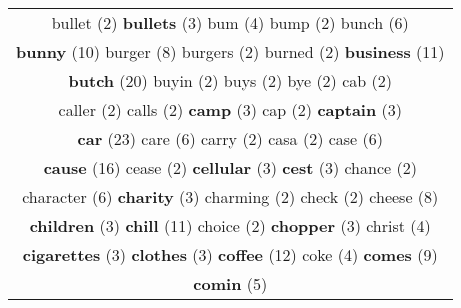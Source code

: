 \documentclass[12pt,a4paper]{article}
\begin{document}
\begin{center}
\begin{longtable}{|c|}
{\footnotesize \textcolor{Verde} {bullet}} \footnotesize{(2)} {\small \textcolor{Laranja} {\bf bullets}} \footnotesize{(3)} {\normalsize \textcolor{VerdeLocao} {bum}} \footnotesize{(4)} {\footnotesize \textcolor{Verde} {bump}} \footnotesize{(2)} {\Large \textcolor{VermEscuro} {bunch}} \footnotesize{(6)}  \\ {\Huge \textcolor{AzulEscuro} {\bf bunny}} \footnotesize{(10)} {\huge \textcolor{Amarelo} {burger}} \footnotesize{(8)} {\footnotesize \textcolor{Verde} {burgers}} \footnotesize{(2)} {\footnotesize \textcolor{Verde} {burned}} \footnotesize{(2)} {\Huge \textcolor{AzulEscuro} {\bf business}} \footnotesize{(11)}  \\ {\Huge \textcolor{AzulEscuro} {\bf butch}} \footnotesize{(20)} {\footnotesize \textcolor{Verde} {buyin}} \footnotesize{(2)} {\footnotesize \textcolor{Verde} {buys}} \footnotesize{(2)} {\footnotesize \textcolor{Verde} {bye}} \footnotesize{(2)} {\footnotesize \textcolor{Verde} {cab}} \footnotesize{(2)}  \\ {\footnotesize \textcolor{Verde} {caller}} \footnotesize{(2)} {\footnotesize \textcolor{Verde} {calls}} \footnotesize{(2)} {\small \textcolor{Laranja} {\bf camp}} \footnotesize{(3)} {\footnotesize \textcolor{Verde} {cap}} \footnotesize{(2)} {\small \textcolor{Laranja} {\bf captain}} \footnotesize{(3)}  \\ {\Huge \textcolor{AzulEscuro} {\bf car}} \footnotesize{(23)} {\Large \textcolor{VermEscuro} {care}} \footnotesize{(6)} {\footnotesize \textcolor{Verde} {carry}} \footnotesize{(2)} {\footnotesize \textcolor{Verde} {casa}} \footnotesize{(2)} {\Large \textcolor{VermEscuro} {case}} \footnotesize{(6)}  \\ {\Huge \textcolor{AzulEscuro} {\bf cause}} \footnotesize{(16)} {\footnotesize \textcolor{Verde} {cease}} \footnotesize{(2)} {\small \textcolor{Laranja} {\bf cellular}} \footnotesize{(3)} {\small \textcolor{Laranja} {\bf cest}} \footnotesize{(3)} {\footnotesize \textcolor{Verde} {chance}} \footnotesize{(2)}  \\ {\Large \textcolor{VermEscuro} {character}} \footnotesize{(6)} {\small \textcolor{Laranja} {\bf charity}} \footnotesize{(3)} {\footnotesize \textcolor{Verde} {charming}} \footnotesize{(2)} {\footnotesize \textcolor{Verde} {check}} \footnotesize{(2)} {\huge \textcolor{Amarelo} {cheese}} \footnotesize{(8)}  \\ {\small \textcolor{Laranja} {\bf children}} \footnotesize{(3)} {\Huge \textcolor{AzulEscuro} {\bf chill}} \footnotesize{(11)} {\footnotesize \textcolor{Verde} {choice}} \footnotesize{(2)} {\small \textcolor{Laranja} {\bf chopper}} \footnotesize{(3)} {\normalsize \textcolor{VerdeLocao} {christ}} \footnotesize{(4)}  \\ {\small \textcolor{Laranja} {\bf cigarettes}} \footnotesize{(3)} {\small \textcolor{Laranja} {\bf clothes}} \footnotesize{(3)} {\Huge \textcolor{AzulEscuro} {\bf coffee}} \footnotesize{(12)} {\normalsize \textcolor{VerdeLocao} {coke}} \footnotesize{(4)} {\Huge \textcolor{AzulEscuro} {\bf comes}} \footnotesize{(9)}  \\ {\large \textcolor{Roxo} {\bf comin}} \footnotesize{(5)} {\small \textcolor{Laranja} {\bf 
\end{longtable}
\end{center}
\end{document}
